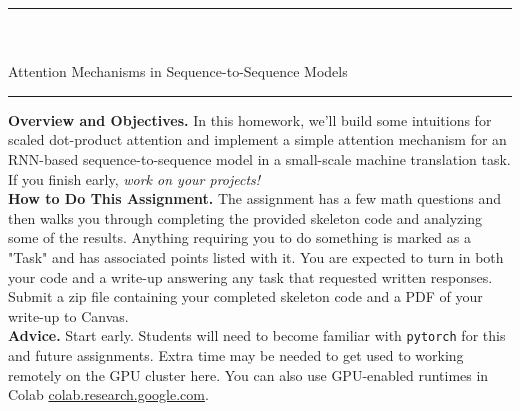 \documentclass[a4paper,10pt]{article}
\begin{document}

\sffamily

\begin{center}
\noindent\rule{\textwidth}{1pt}\\[10pt]
{\color{blue!60}{AI539 Natural Language Processing with Deep Learning -- Homework 4}}\\[10pt]
{\LARGE Attention Mechanisms in Sequence-to-Sequence Models}\\[10pt]
\noindent\rule{\textwidth}{1pt}
\end{center}

\noindent\textbf{Overview and Objectives.} In this homework, we'll build some intuitions for scaled dot-product attention and implement a simple attention mechanism for an RNN-based sequence-to-sequence model in a small-scale machine translation task. If you finish early, \emph{work on your projects!}\\

\noindent\textbf{How to Do This Assignment.} The assignment has a few math questions and then walks you through completing the provided skeleton code and analyzing some of the results. Anything requiring you to do something is marked as a "Task" and has associated points listed with it. You are expected to turn in both your code and a write-up answering any task that requested written responses. Submit a zip file containing your completed skeleton code and a PDF of your write-up to Canvas.\\ 

\noindent\textbf{Advice.} Start early. Students will need to become familiar with \texttt{pytorch} for this and future assignments. Extra time may be needed to get used to working remotely on the GPU cluster here. You can also use GPU-enabled runtimes in Colab \url{colab.research.google.com}.
\end{document}
